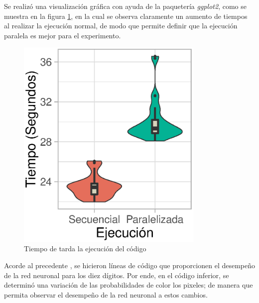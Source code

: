 \documentclass[12pt, letterpaper] {article}
\begin{document}
Se realizó una visualización gráfica con ayuda de la paquetería \textit{ggplot2}, como se muestra en la figura \ref{PS}, en la cual se observa claramente un aumento de tiempos al realizar la ejecución normal, de modo que permite definir que la ejecución paralela es mejor para el experimento. 

\begin{figure}[H]
\centering\includegraphics[width=90mm]{Tejec.eps}
\caption{Tiempo de tarda la ejecución del código}
\label{PS}
\end{figure}

Acorde al precedente \cite{PAP12}, se hicieron líneas de código que proporcionen el desempeño de la red neuronal para los diez dígitos. Por ende, en el código inferior, se determinó una variación de las probabilidades de color los pixeles; de manera que permita observar el desempeño de la red neuronal a estos cambios. 
\end{document}
